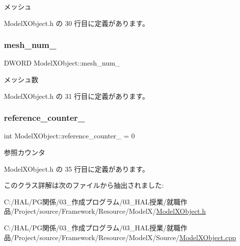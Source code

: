 メッシュ 



 Model\+X\+Object.\+h の 30 行目に定義があります。

\mbox{\label{class_model_x_object_af493845ef291f950fcaee2d3eba10bc5}} 
\subsubsection{\texorpdfstring{mesh\+\_\+num\+\_\+}{mesh\_num\_}}
{\footnotesize\ttfamily D\+W\+O\+RD Model\+X\+Object\+::mesh\+\_\+num\+\_\+\hspace{0.3cm}{\ttfamily [private]}}



メッシュ数 



 Model\+X\+Object.\+h の 31 行目に定義があります。

\mbox{\label{class_model_x_object_a8ae0e1ca4a249c3b475d41107c4816d3}} 
\subsubsection{\texorpdfstring{reference\+\_\+counter\+\_\+}{reference\_counter\_}}
{\footnotesize\ttfamily int Model\+X\+Object\+::reference\+\_\+counter\+\_\+ = 0\hspace{0.3cm}{\ttfamily [private]}}



参照カウンタ 



 Model\+X\+Object.\+h の 35 行目に定義があります。



このクラス詳解は次のファイルから抽出されました\+:\begin{DoxyCompactItemize}
\item 
C\+:/\+H\+A\+L/\+P\+G関係/03\+\_\+作成プログラム/03\+\_\+\+H\+A\+L授業/就職作品/\+Project/source/\+Framework/\+Resource/\+Model\+X/\mbox{\hyperlink{_model_x_object_8h}{Model\+X\+Object.\+h}}\item 
C\+:/\+H\+A\+L/\+P\+G関係/03\+\_\+作成プログラム/03\+\_\+\+H\+A\+L授業/就職作品/\+Project/source/\+Framework/\+Resource/\+Model\+X/\+Source/\mbox{\hyperlink{_model_x_object_8cpp}{Model\+X\+Object.\+cpp}}\end{DoxyCompactItemize}
